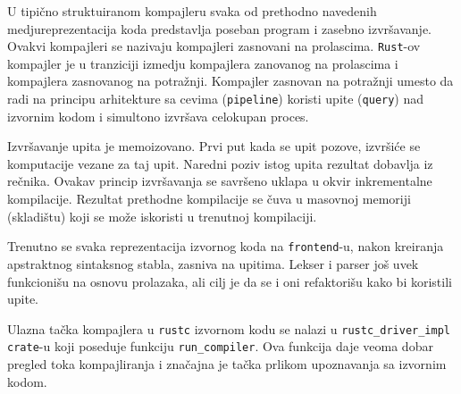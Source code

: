 U tipično struktuiranom kompajleru svaka od prethodno navedenih medjureprezentacija koda predstavlja 
poseban program i zasebno izvršavanje. Ovakvi kompajleri se nazivaju 
kompajleri zasnovani na prolascima. \verb|Rust|-ov kompajler je u tranziciji izmedju 
kompajlera zanovanog na prolascima i kompajlera zasnovanog na potražnji. Kompajler 
zasnovan na potražnji umesto da radi na principu arhitekture sa cevima (\verb|pipeline|)
koristi upite (\verb|query|) nad izvornim kodom i simultono izvršava celokupan proces.

Izvršavanje upita je memoizovano. Prvi put kada se upit pozove, izvršiće se komputacije 
vezane za taj upit. Naredni poziv istog upita rezultat dobavlja iz rečnika.
Ovakav princip izvršavanja se savršeno uklapa u okvir inkrementalne kompilacije. 
Rezultat prethodne kompilacije se čuva u masovnoj memoriji (skladištu) koji se može iskoristi
u trenutnoj kompilaciji.

Trenutno se svaka reprezentacija izvornog koda na \verb|frontend|-u, 
nakon kreiranja apstraktnog sintaksnog stabla, zasniva na upitima. 
Lekser i parser još uvek funkcionišu na osnovu prolazaka, 
ali cilj je da se i oni refaktorišu kako bi koristili upite.

Ulazna tačka kompajlera u \verb|rustc| izvornom kodu se nalazi u \verb|rustc_driver_impl| \verb|crate|-u
koji poseduje funkciju \verb|run_compiler|. Ova funkcija daje veoma dobar pregled toka kompajliranja 
i značajna je tačka prlikom upoznavanja sa izvornim kodom. 